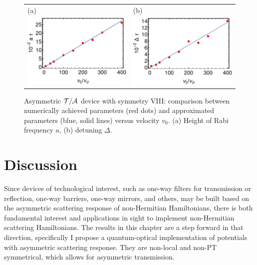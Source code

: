 \begin{figure}
  \begin{center}
  \begin{tabular}{ll}
    (a)&(b)\\
    \includegraphics[width=0.48\linewidth]{Figures/asym_fig_t_a_param1.pdf}
    &
    \includegraphics[width=0.48\linewidth]{Figures/asym_fig_t_a_param2.pdf}
  \end{tabular}
  \end{center}
  \caption{Asymmetric ${\cal T/A}$ device with symmetry VIII: comparison between numerically achieved parameters (red dots) and approximated parameters (blue, solid lines) versus velocity $v_0$.
  (a) Height of Rabi frequency $a$, (b) detuning $\Delta$.
  \label{fig_t_a_param}}
\end{figure}

%
%
%
%

%
%
\section{Discussion\label{sec:chapter3_Discussion}}

Since devices of technological interest, such as one-way filters for transmission or reflection, one-way barriers, one-way mirrors, and others, may be built based on the asymmetric scattering response of non-Hermitian Hamiltonians, there is both fundamental
interest and applications in sight to implement non-Hermitian scattering Hamiltonians. The results in this chapter are a step forward in that direction, specifically I propose a quantum-optical implementation of potentials with asymmetric scattering response.
They are non-local and non-PT symmetrical, which allows for asymmetric transmission.

